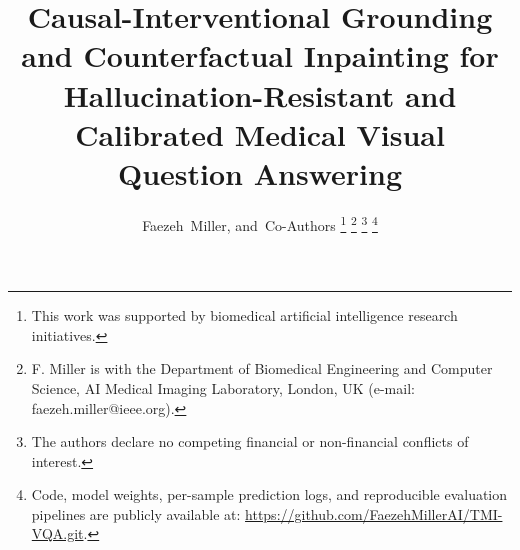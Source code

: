 \documentclass[journal,twoside,web]{ieeecolor}
\begin{document}
\title{Causal-Interventional Grounding and Counterfactual Inpainting for Hallucination-Resistant and Calibrated Medical Visual Question Answering}

\author{Faezeh~Miller,  and~Co-Authors
\thanks{This work was supported by biomedical artificial intelligence research initiatives.}
\thanks{F. Miller is with the Department of Biomedical Engineering and Computer Science, AI Medical Imaging Laboratory, London, UK (e-mail: faezeh.miller@ieee.org).}
\thanks{The authors declare no competing financial or non-financial conflicts of interest.}
\thanks{Code, model weights, per-sample prediction logs, and reproducible evaluation pipelines are publicly available at: \url{https://github.com/FaezehMillerAI/TMI-VQA.git}.}}

\maketitle
\end{document}
